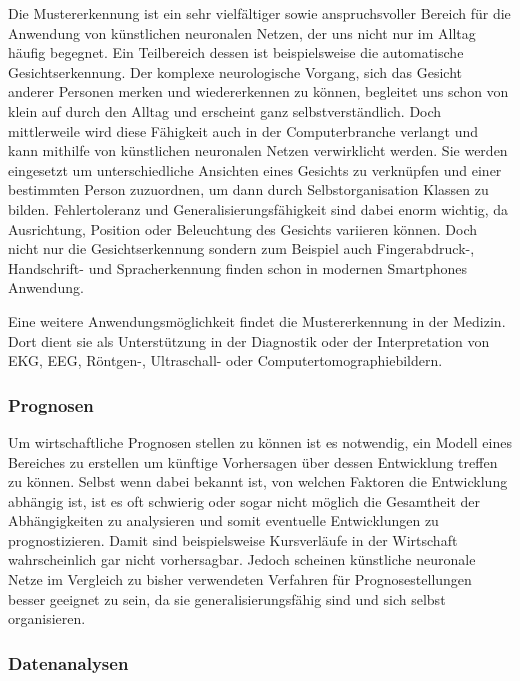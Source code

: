 \documentclass[twoside,a4paper]{article}
\begin{document}
Die Mustererkennung ist ein sehr vielfältiger sowie anspruchsvoller Bereich für die Anwendung von künstlichen neuronalen Netzen, der uns nicht nur im Alltag häufig begegnet. Ein Teilbereich dessen ist beispielsweise die automatische Gesichtserkennung. Der komplexe neurologische Vorgang, sich das Gesicht anderer Personen merken und wiedererkennen  zu können, begleitet uns schon von klein auf durch den Alltag und erscheint ganz selbstverständlich. Doch mittlerweile wird diese Fähigkeit auch in der Computerbranche verlangt und kann mithilfe von künstlichen neuronalen Netzen verwirklicht werden. Sie werden eingesetzt um unterschiedliche Ansichten eines Gesichts zu verknüpfen und einer bestimmten Person zuzuordnen, um dann durch Selbstorganisation Klassen zu bilden. Fehlertoleranz und Generalisierungsfähigkeit sind dabei enorm wichtig, da Ausrichtung, Position oder Beleuchtung des Gesichts variieren können. Doch nicht nur die Gesichtserkennung sondern zum Beispiel auch Fingerabdruck-, Handschrift- und Spracherkennung finden schon in modernen Smartphones Anwendung.

Eine weitere Anwendungsmöglichkeit findet die Mustererkennung in der Medizin. Dort dient sie als Unterstützung in der Diagnostik oder der Interpretation von EKG, EEG, Röntgen-, Ultraschall- oder Computertomographiebildern.

\subsubsection{Prognosen}

Um wirtschaftliche Prognosen stellen zu können ist es notwendig, ein Modell eines Bereiches zu erstellen um künftige Vorhersagen über dessen Entwicklung treffen zu können. Selbst wenn dabei bekannt ist, von welchen Faktoren die Entwicklung  abhängig ist, ist es oft schwierig oder sogar nicht möglich die Gesamtheit der Abhängigkeiten zu analysieren und somit eventuelle Entwicklungen zu prognostizieren. Damit sind beispielsweise Kursverläufe in der Wirtschaft wahrscheinlich gar nicht vorhersagbar. Jedoch scheinen künstliche neuronale Netze im Vergleich zu bisher verwendeten Verfahren für Prognosestellungen besser geeignet zu sein, da sie generalisierungsfähig sind und sich selbst organisieren.

\subsubsection{Datenanalysen}
\end{document}
